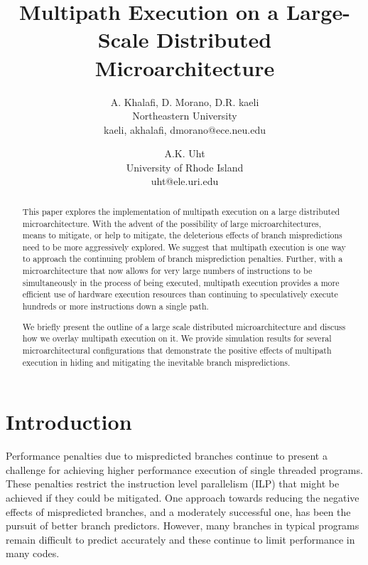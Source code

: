 \documentclass[10pt,dvips]{article}
\begin{document}
\parskip 3mm
%
%
\title{Multipath Execution on a Large-Scale Distributed 
Microarchitecture}
%
\author{
A. Khalafi, D. Morano, D.R. kaeli\\
Northeastern University\\
{kaeli, akhalafi, dmorano}@ece.neu.edu\\
\and
A.K. Uht \\
University of Rhode Island\\ uht@ele.uri.edu
}
%
\maketitle
\thispagestyle{empty}
%
\begin{abstract}
This paper explores the implementation of multipath execution on a
large distributed microarchitecture.  With the advent of the
possibility of large microarchitectures, means to mitigate, or help to
mitigate, the deleterious effects of branch mispredictions need to be
more aggressively explored.  We suggest that multipath execution is one
way to approach the continuing problem of branch misprediction
penalties.  Further, with a microarchitecture that now allows for very
large numbers of instructions to be simultaneously in the process of
being executed, multipath execution provides a more efficient use of
hardware execution resources than continuing to speculatively execute
hundreds or more instructions down a single path.

We briefly present the outline of a large scale distributed microarchitecture
and discuss how we overlay multipath execution on it.
We provide simulation results for several microarchitectural configurations
that demonstrate the positive effects of multipath execution in
hiding and mitigating the inevitable branch mispredictions.
\end{abstract}
%
\section{Introduction}
%
Performance penalties due to mispredicted branches continue to
present a challenge for achieving higher performance execution
of single threaded programs.
These penalties restrict the instruction level parallelism (ILP)
that might be achieved if they could be mitigated.
One approach towards reducing the negative effects of mispredicted
branches, and a moderately successful one, has been the pursuit
of better branch predictors.  However, many branches in typical
programs remain difficult to predict accurately and these continue
to limit performance in many codes.
\end{document}

